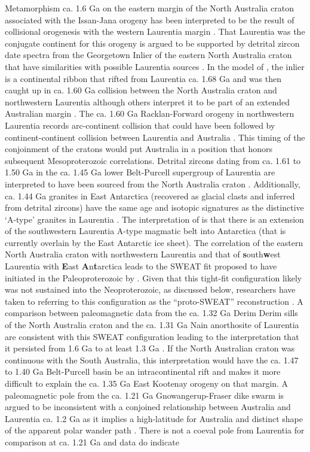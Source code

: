 \documentclass[twocolumn, switch]{article} %
\begin{document}
Metamorphism ca. 1.6 Ga on the eastern margin of the North Australia craton associated with the Issan-Jana orogeny has been interpreted to be the  result of collisional orogenesis with the western Laurentia margin \citep{Nordsvan2018a, Pourteau2018a, Gibson2020a}. That Laurentia was the conjugate continent for this orogeny is argued to be supported by detrital zircon date spectra from the Georgetown Inlier of the eastern North Australia craton that have similarities with possible Laurentia sources \citep{Nordsvan2018a}. In the model of \cite{Nordsvan2018a}, the inlier is a continental ribbon that rifted from Laurentia ca. 1.68 Ga and was then caught up in ca. 1.60 Ga collision between the North Australia craton and northwestern Laurentia although others interpret it to be part of an extended Australian margin \citep{Gibson2020a}. The ca. 1.60 Ga Racklan-Forward orogeny in northwestern Laurentia records arc-continent collision that could have been followed by continent-continent collision between Laurentia and Australia \citep{Thorkelson2005a, Furlanetto2013a}. This timing of the conjoinment of the cratons would put Australia in a position that honors subsequent Mesoproterozoic correlations. Detrital zircons dating from ca. 1.61 to 1.50 Ga in the ca. 1.45 Ga lower Belt-Purcell supergroup of Laurentia are interpreted to have been sourced from the North Australia craton \citep{Jones2015a}. Additionally, ca. 1.44 Ga granites in East Antarctica (recovered as glacial clasts and inferred from detrital zircons) have the same age and isotopic signatures as the distinctive `A-type' granites in Laurentia \citep{Goodge2008a}. The interpretation of \cite{Goodge2008a, Goodge2017a} is that there is an extension of the southwestern Laurentia A-type magmatic belt into Antarctica (that is currently overlain by the East Antarctic ice sheet). The correlation of the eastern North Australia craton with northwestern Laurentia and that of \textbf{s}outh\textbf{w}est Laurentia with \textbf{E}ast \textbf{A}n\textbf{t}arctica leads to the SWEAT fit proposed to have initiated in the Paleoproterozoic by \cite{Moores1991a}. Given that this tight-fit configuration likely was not sustained into the Neoproterozoic, as discussed below, researchers have taken to referring to this configuration as  the ``proto-SWEAT'' reconstruction \citep{Payne2009b, Kirscher2020a}. A comparison between paleomagnetic data from the ca. 1.32 Ga Derim Derim sills of the North Australia craton and the ca. 1.31 Ga Nain anorthosite of Laurentia are consistent with this SWEAT configuration leading to the interpretation that it persisted from 1.6 Ga to at least 1.3 Ga \citep{Kirscher2020a}. If the North Australian craton was continuous with the South Australia, this interpretation would have the ca. 1.47 to 1.40 Ga Belt-Purcell basin be an intracontinental rift and makes it more difficult to explain the ca. 1.35 Ga East Kootenay orogeny on that margin. A paleomagnetic pole from the ca. 1.21 Ga Gnowangerup-Fraser dike swarm is argued to be inconsistent with a conjoined relationship between Australia and Laurentia ca. 1.2 Ga as it implies a high-latitude for Australia and distinct shape of the apparent polar wander path \citep{Pisarevsky2014a}. There is not a coeval pole from Laurentia for comparison at ca. 1.21 Ga and data do indicate 
\end{document}
